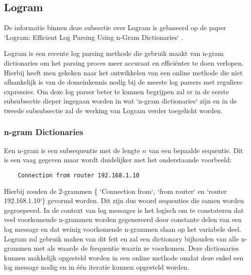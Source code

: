 \subsection{Logram}
De informatie binnen deze subsectie over Logram is gebaseerd op de paper `Logram: Efficient Log Parsing Using n-Gram Dictionaries` \autocite{dai2020logram}. 

Logram is een recente log parsing methode die gebruik maakt van n-gram dictionaries om het parsing proces meer accuraat en efficiënter te doen verlopen. Hierbij heeft men gekeken naar het ontwikkelen van een online methode die niet afhankelijk is van de domeinkennis nodig bij de meeste log parsers met reguliere expressies. Om deze log parser beter te kunnen begrijpen zal er in de eerste subsubsectie dieper ingegaan worden in wat `n-gram dictionaries` zijn en in de tweede subsubsectie zal de werking van Logram verder toegelicht worden.

\subsubsection{n-gram Dictionaries}
Een n-gram is een subsequentie met de lengte $n$ van een bepaalde sequentie. Dit is een vaag gegeven maar wordt duidelijker met het onderstaande voorbeeld:
\begin{verbatim}
    Connection from router 192.168.1.10
\end{verbatim}
Hierbij zouden de 2-grammen \{ `Connection from`,  `from router` en `router 192.168.1.10`\} gevormd worden. Dit zijn dus woord sequenties die samen worden gegroepeerd. In de context van log messages is het logisch om te constateren dat veel voorkomende n-grammen worden gegenereerd door constante delen van een log message en dat weinig voorkomende n-grammen slaan op het variabele deel. Logram zal gebruik maken van dit feit en zal een dictionary bijhouden van alle n-grammen met als waarde de frequentie waarin ze voorkomen. Deze dictionaries kunnen makkelijk opgesteld worden in een online methode omdat deze enkel een log message nodig en in één iteratie kunnen opgesteld worden.

